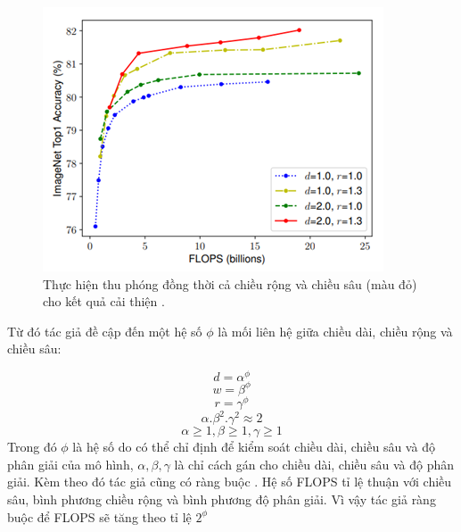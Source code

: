 \begin{figure}[ht!]
\centerline{\includegraphics[scale=0.7]{images/eff4.png}}
\caption{Thực hiện thu phóng đồng thời cả chiều rộng và chiều sâu (màu đỏ) cho kết quả cải thiện \cite{efficientnet:2020}.}
\label{fig:eff4}
\end{figure}
Từ đó tác giả đề cập đến một hệ số $\phi$ là mối liên hệ giữa chiều dài, chiều rộng và chiều sâu:\par

$$d=\alpha^\phi$$ 
$$w= \beta^\phi $$
$$r= \gamma^\phi$$ 
$$\alpha.\beta^2.\gamma^2 \approx 2$$ 
$$\alpha\geq1, \beta\geq1,\gamma\geq1$$
Trong đó $\phi$ là hệ số do có thể chỉ định để kiểm soát chiều dài, chiều sâu và độ phân giải của mô hình, $\alpha,\beta,\gamma$ là chỉ cách gán cho chiều dài, chiều sâu và độ phân giải. Kèm theo đó tác giả cũng có ràng buộc  . Hệ số FLOPS tỉ lệ thuận với chiều sâu, bình phương chiều rộng và bình phương độ phân giải. Vì vậy tác giả ràng buộc để FLOPS sẽ tăng theo tỉ lệ $2^\phi$
